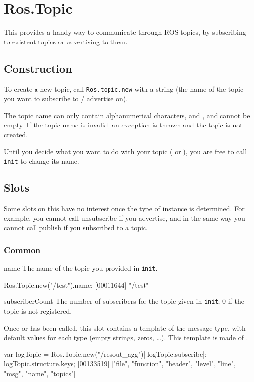 \section{Ros.Topic}

This \UObject provides a handy way to communicate through ROS topics, by
subscribing to existent topics or advertising to them.

\subsection{Construction}

To create a new topic, call \lstinline{Ros.topic.new} with a string (the
name of the topic you want to subscribe to / advertise on).

The topic name can only contain alphanumerical characters, \samp{/} and
\samp{\_}, and cannot be empty.  If the topic name is invalid, an exception
is thrown and the topic is not created.

Until you decide what you want to do with your topic ( or
), you are free to call \lstinline{init} to change its
name.


\subsection{Slots}

Some slots on this \UObject have no interest once the type of instance is
determined. For example, you cannot call unsubscribe if you advertise, and
in the same way you cannot call publish if you subscribed to a topic.

\subsubsection{Common}

\begin{urbiscriptapi}

\item[name]%
  The name of the topic you provided in \lstinline{init}.
\begin{urbiscript}
Ros.Topic.new("/test").name;
[00011644] "/test"
\end{urbiscript}


\item[subscriberCount]%
  The number of subscribers for the topic given in \lstinline{init}; 0 if
  the topic is not registered.

\item[structure]%
  Once  or  has been called, this slot
  contains a template of the message type, with default values for each type
  (empty strings, zeros, \ldots). This template is made of
  .
\begin{urbiscript}
var logTopic = Ros.Topic.new("/rosout_agg")|
logTopic.subscribe|;
logTopic.structure.keys;
[00133519] ["file", "function", "header", "level", "line", "msg", "name", "topics"]
\end{urbiscript}
\end{urbiscriptapi}


